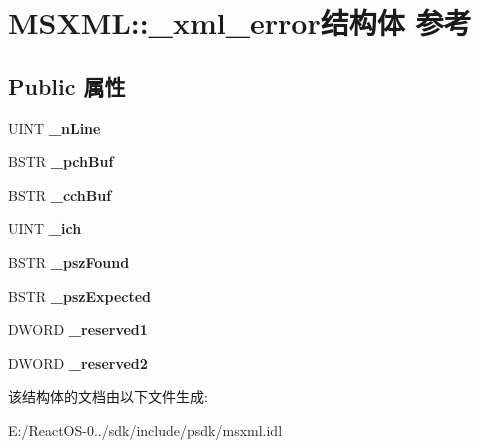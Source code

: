 \hypertarget{struct_m_s_x_m_l_1_1__xml__error}{}\section{M\+S\+X\+ML\+:\+:\+\_\+xml\+\_\+error结构体 参考}
\label{struct_m_s_x_m_l_1_1__xml__error}
\subsection*{Public 属性}
\begin{DoxyCompactItemize}
\item 
\mbox{\label{struct_m_s_x_m_l_1_1__xml__error_ac51745cd3422801b990cebefed582750}} 
U\+I\+NT {\bfseries \+\_\+n\+Line}
\item 
\mbox{\label{struct_m_s_x_m_l_1_1__xml__error_ae053a99f00fc46589b4cc43a56667647}} 
B\+S\+TR {\bfseries \+\_\+pch\+Buf}
\item 
\mbox{\label{struct_m_s_x_m_l_1_1__xml__error_a22eac20704666f7d5c50f2e14b796a25}} 
B\+S\+TR {\bfseries \+\_\+cch\+Buf}
\item 
\mbox{\label{struct_m_s_x_m_l_1_1__xml__error_aa91869916c485b1879277cb9015910b1}} 
U\+I\+NT {\bfseries \+\_\+ich}
\item 
\mbox{\label{struct_m_s_x_m_l_1_1__xml__error_afb4886f578fdb7865df3574042e9b66c}} 
B\+S\+TR {\bfseries \+\_\+psz\+Found}
\item 
\mbox{\label{struct_m_s_x_m_l_1_1__xml__error_a0661907fdb22c3a38000d8a8abada137}} 
B\+S\+TR {\bfseries \+\_\+psz\+Expected}
\item 
\mbox{\label{struct_m_s_x_m_l_1_1__xml__error_ad5241dd8458c51f7356e12fe92773165}} 
D\+W\+O\+RD {\bfseries \+\_\+reserved1}
\item 
\mbox{\label{struct_m_s_x_m_l_1_1__xml__error_a4eadba37e06ca98ad1dbeb857e7dcd56}} 
D\+W\+O\+RD {\bfseries \+\_\+reserved2}
\end{DoxyCompactItemize}


该结构体的文档由以下文件生成\+:\begin{DoxyCompactItemize}
\item 
E\+:/\+React\+O\+S-\/0../sdk/include/psdk/msxml.\+idl\end{DoxyCompactItemize}
